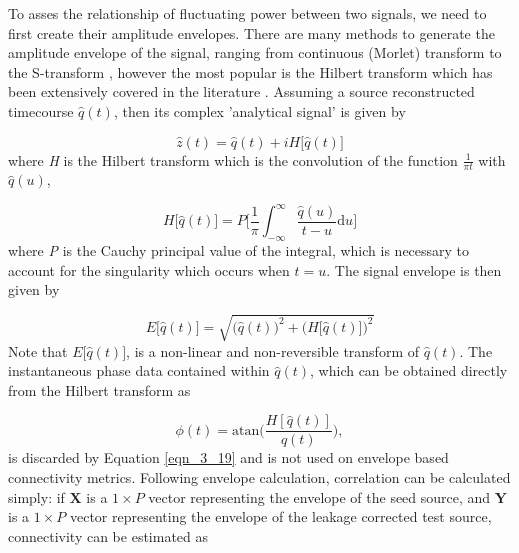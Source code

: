 To asses the relationship of fluctuating power between two signals, we need to first create their amplitude envelopes. There are many methods to generate the amplitude envelope of the signal, ranging from continuous (Morlet) transform \citep{Quyen2001,Kiebel2005} to the S-transform \citep{Stockwell1996}, however the most popular is the Hilbert transform which has been extensively covered in the literature \citep{Tass1998,Quyen2001,Freeman2004,Kiebel2005}. Assuming a source reconstructed timecourse $\hat{q}(t)$, then its complex 'analytical signal' is given by

\begin{equation}
\hat{z}(t)=\hat{q}(t)+iH\big[\hat{q}(t)\big]
\end{equation} where \textit{H} is the Hilbert transform which is the convolution of the function $\frac{1}{\pi t}$ with $\hat{q}(u)$,

\begin{equation}
H\big[\hat{q}(t)\big]=P\Bigg[\frac{1}{\pi}\int_{-\infty}^{\infty}\frac{\hat{q}(u)}{t-u}\text{d}u\Bigg]
\end{equation} where \textit{P} is the Cauchy principal value of the integral, which is necessary to account for the singularity which occurs when $t=u$. The signal envelope is then given by

\begin{equation}
E\big[\hat{q}(t)\big] = \sqrt{\big(\hat{q}(t)\big)^2+\big(H\big[\hat{q}(t)\big]\big)^2}\label{eqn_3_19}
\end{equation} Note that $E\big[\hat{q}(t)\big]$, is a non-linear and non-reversible transform of $\hat{q}(t)$. The instantaneous phase data contained within $\hat{q}(t)$, which can be obtained directly from the Hilbert transform as

\begin{equation}
\phi(t)=\text{atan}\Bigg(\frac{H[\hat{q}(t)]}{\hat{q}(t)}\Bigg), \label{eqn_3_hilbert_phase}
\end{equation} is discarded by Equation \ref{eqn_3_19} and is not used on envelope based connectivity metrics. Following envelope calculation, correlation can be calculated simply: if $\mathbf{X}$ is a $1 \times P$ vector representing the envelope of the seed source, and $\mathbf{Y}$ is a $1 \times P$ vector representing the envelope of the leakage corrected test source, connectivity can be estimated as

